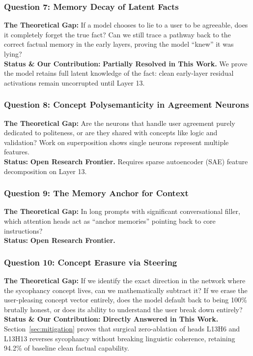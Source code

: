 \documentclass[journal,10pt,twocolumn]{IEEEtran}
\begin{document}
\subsubsection{Question 7: Memory Decay of Latent Facts}
\textbf{The Theoretical Gap:} If a model chooses to lie to a user to be agreeable, does it completely forget the true fact? Can we still trace a pathway back to the correct factual memory in the early layers, proving the model ``knew'' it was lying? \\
\textbf{Status \& Our Contribution:} \textbf{Partially Resolved in This Work.} We prove the model retains full latent knowledge of the fact: clean early-layer residual activations remain uncorrupted until Layer 13.

\subsubsection{Question 8: Concept Polysemanticity in Agreement Neurons}
\textbf{The Theoretical Gap:} Are the neurons that handle user agreement purely dedicated to politeness, or are they shared with concepts like logic and validation? Work on superposition shows single neurons represent multiple features. \\
\textbf{Status:} \textbf{Open Research Frontier.} Requires sparse autoencoder (SAE) feature decomposition on Layer 13.

\subsubsection{Question 9: The Memory Anchor for Context}
\textbf{The Theoretical Gap:} In long prompts with significant conversational filler, which attention heads act as ``anchor memories'' pointing back to core instructions? \\
\textbf{Status:} \textbf{Open Research Frontier.}

\subsubsection{Question 10: Concept Erasure via Steering}
\textbf{The Theoretical Gap:} If we identify the exact direction in the network where the sycophancy concept lives, can we mathematically subtract it? If we erase the user-pleasing concept vector entirely, does the model default back to being 100\% brutally honest, or does its ability to understand the user break down entirely? \\
\textbf{Status \& Our Contribution:} \textbf{Directly Answered in This Work.} Section~\ref{sec:mitigation} proves that surgical zero-ablation of heads L13H6 and L13H13 reverses sycophancy without breaking linguistic coherence, retaining 94.2\% of baseline clean factual capability.
\end{document}
